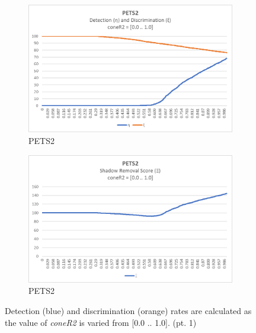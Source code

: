 \begin{appendices}
\begin{figure}
\begin{subfigure}{.45\linewidth}
  \includegraphics[width=1\linewidth]{figures/appendix/pets2_coneR2_response.jpg}
  \caption{PETS2}
\end{subfigure}
\hfill
\begin{subfigure}{.45\linewidth}
  \includegraphics[width=1\linewidth]{figures/appendix/pets2_coneR2_score.jpg}
  \caption{PETS2}
\end{subfigure}

\caption{Detection (blue) and discrimination (orange) rates are calculated as the value of \textit{coneR2} is varied from [0.0 .. 1.0]. (pt. 1)}
\end{figure}


\end{appendices}
